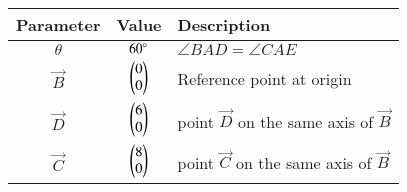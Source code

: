 \begin{tabular}{|c|c|p{5cm}|}
\hline
\textbf{Parameter} & \textbf{Value} & \textbf{Description} \\
\hline
	$\theta$ & $60\degree$ & $\angle{BAD} = \angle{CAE}$ \\
\hline
	$\vec{B}$ & $\begin{pmatrix}0\\0\end{pmatrix}$ & Reference point at origin \\
\hline
	$\vec{D}$ & $\begin{pmatrix}6\\0\end{pmatrix}$ & point $\vec{D}$ on the same axis of $\vec{B}$ \\
\hline
	$\vec{C}$ & $\begin{pmatrix}8\\0\end{pmatrix}$ & point $\vec{C}$ on the same axis of $\vec{B}$ \\
\hline
\end{tabular}
